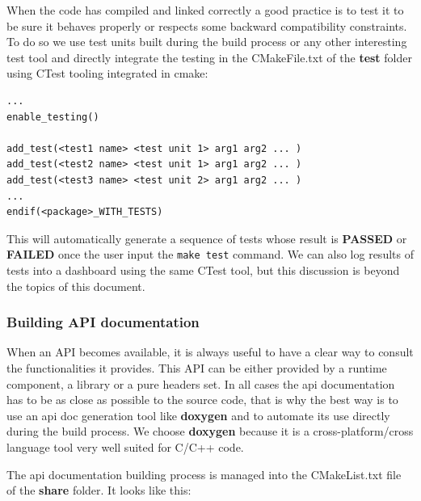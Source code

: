 \documentclass[12pt,a4paper]{article}
\begin{document}
When the code has compiled and linked correctly a good practice is to test it to be sure it behaves properly or respects some backward compatibility constraints. To do so we use test units built during the build process or any other interesting test tool and directly integrate the testing in the CMakeFile.txt of the \textbf{test} folder using CTest tooling integrated in cmake:

\begin{verbatim}
...
enable_testing()

add_test(<test1 name> <test unit 1> arg1 arg2 ... )
add_test(<test2 name> <test unit 1> arg1 arg2 ... )
add_test(<test3 name> <test unit 2> arg1 arg2 ... )
...
endif(<package>_WITH_TESTS)
\end{verbatim}

This will automatically generate a sequence of tests whose result is \textbf{PASSED} or \textbf{FAILED} once the user input the \texttt{make test} command. We can also log results of tests into a dashboard using the same CTest tool, but this discussion is beyond the topics of this document.

\subsubsection{Building API documentation}

When an API becomes available, it is always useful to have a clear way to consult the functionalities it provides. This API can be either provided by a runtime component, a library or a pure headers set. In all cases the api documentation has to be as close as possible to the source code, that is why the best way is to use an api doc generation tool like \textbf{doxygen} and to automate its use directly during the build process. We choose \textbf{doxygen} because it is a cross-platform/cross language tool very well suited for C/C++ code.

The api documentation building process is managed into the CMakeList.txt file of the \textbf{share} folder. It looks like this:
\end{document}
